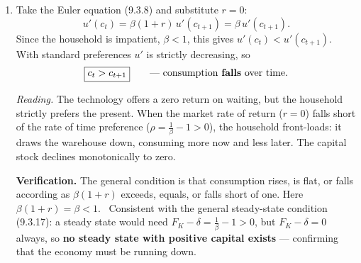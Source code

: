 \documentclass[12pt, letterpaper]{article}
\begin{document}
\begin{tcolorbox}[evenbox,title={Problem 9.2 \quad Storage}]
\begin{enumerate}
\item Take the Euler equation (9.3.8) and substitute $r=0$:
\[
u'(c_t)=\beta(1+r)\,u'(c_{t+1})=\beta\,u'(c_{t+1}).
\]
Since the household is impatient, $\beta<1$, this gives $u'(c_t)<u'(c_{t+1})$. With
standard preferences $u'$ is strictly decreasing, so
\[
\boxed{c_t>c_{t+1}}\qquad\text{--- consumption \textbf{falls} over time.}
\]

\emph{Reading.} The technology offers a zero return on waiting, but the household strictly
prefers the present. When the market rate of return ($r=0$) falls short of the rate of time
preference ($\rho=\frac{1}{\beta}-1>0$), the household front-loads: it draws the warehouse
down, consuming more now and less later. The capital stock declines monotonically to zero.

\smallskip
\textbf{Verification.} The general condition is that consumption rises, is flat, or falls
according as $\beta(1+r)$ exceeds, equals, or falls short of one. Here
$\beta(1+r)=\beta<1$. \checkmark\ Consistent with the general steady-state condition
(9.3.17): a steady state would need $F_K-\delta=\frac{1}{\beta}-1>0$, but $F_K-\delta=0$
always, so \textbf{no steady state with positive capital exists} --- confirming that the
economy must be running down.
\end{enumerate}
\end{tcolorbox}
\end{document}
